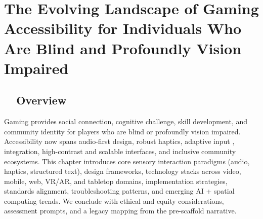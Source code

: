 \chapter{The Evolving Landscape of Gaming Accessibility for Individuals Who Are Blind and Profoundly Vision Impaired}
\label{chap:gaming-\gidx{accessibility}{accessibility}}

\section{~~Overview}
\label{sec:gaming-overview}
Gaming provides social connection, cognitive challenge, skill development, and community identity for players who are blind or profoundly vision impaired. Accessibility now spans audio-first design, robust haptics, adaptive input ,  integration, high-contrast and scalable interfaces, and inclusive community ecosystems\supercite{AbleGamers2025}. This chapter introduces core sensory interaction paradigms (audio, haptics, structured text), design frameworks, technology stacks across video, mobile, web, VR/AR, and tabletop domains, implementation strategies, standards alignment, troubleshooting patterns, and emerging AI + spatial computing trends. We conclude with ethical and equity considerations, assessment prompts, and a legacy mapping from the pre-scaffold narrative.

